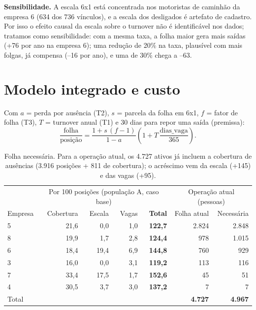 \documentclass[11pt,a4paper]{article}
\begin{document}
\textbf{Sensibilidade.} A escala 6x1 está concentrada nos motoristas de caminhão da empresa 6 (634 dos 736 vínculos), e a escala dos desligados é artefato de cadastro. Por isso o efeito causal da escala sobre o turnover não é identificável nos dados; tratamos como sensibilidade: com a mesma taxa, a folha maior gera mais saídas (+76 por ano na empresa 6); uma redução de 20\% na taxa, plausível com mais folgas, já compensa (--16 por ano), e uma de 30\% chega a --63.

\section{Modelo integrado e custo}\label{sec:integrado}
Com $a$ = perda por ausência (T2), $s$ = parcela da folha em 6x1, $f$ = fator de folha (T3), $T$ = turnover anual (T1) e 30 dias para repor uma saída (premissa):
\[ \frac{\text{folha}}{\text{posição}} = \frac{1 + s\,(f-1)}{1-a}\left(1 + T\,\frac{\text{dias\_vaga}}{365}\right). \]

\begin{table}[h]
\centering\small
\begin{tabular}{lrrrr|rr}
\toprule
& \multicolumn{4}{c|}{Por 100 posições (população A, caso base)} & \multicolumn{2}{c}{Operação atual (pessoas)} \\
Empresa & Cobertura & Escala & Vagas & \textbf{Total} & Folha atual & Necessária \\
\midrule
5 & 21,6 & 0,0 & 1,0 & \textbf{122,7} & 2.824 & 2.848 \\
8 & 19,9 & 1,7 & 2,8 & \textbf{124,4} & 978 & 1.015 \\
6 & 18,4 & 19,4 & 6,9 & \textbf{144,8} & 760 & 929 \\
3 & 16,0 & 0,0 & 3,1 & \textbf{119,2} & 113 & 116 \\
7 & 33,4 & 17,5 & 1,7 & \textbf{152,6} & 45 & 51 \\
4 & 30,5 & 3,7 & 3,0 & \textbf{137,2} & 7 & 7 \\
\midrule
Total & & & & & \textbf{4.727} & \textbf{4.967} \\
\bottomrule
\end{tabular}
\caption{Folha necessária. Para a operação atual, os 4.727 ativos já incluem a cobertura de ausências (3.916 posições + 811 de cobertura); o acréscimo vem da escala (+145) e das vagas (+95).}
\end{table}
\end{document}
